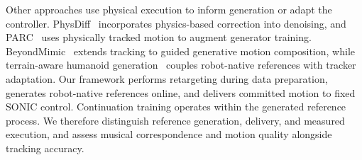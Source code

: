 Other approaches use physical execution to inform generation
or adapt the controller.
PhysDiff~\cite{yuan2023physdiff} incorporates physics-based
correction into denoising, and
PARC~\cite{xu2025parc} uses physically tracked motion
to augment generator training.
BeyondMimic~\cite{liao2025beyondmimic} extends tracking
to guided generative motion composition, while
terrain-aware humanoid generation~\cite{zhang2026wholebody}
couples robot-native references with tracker adaptation.
Our framework performs retargeting during data preparation,
generates robot-native references online, and delivers
committed motion to fixed SONIC control.
Continuation training operates within the generated reference
process.
We therefore distinguish reference generation, delivery,
and measured execution, and assess musical correspondence
and motion quality alongside tracking accuracy.